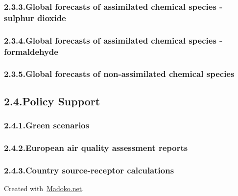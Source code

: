 \documentclass[9pt]{report}
\begin{document}
\subsubsection{2.3.3.\hspace*{0.5em}Global forecasts of assimilated chemical species - sulphur dioxide}\label{sec-global-forecasts-of-assimilated-chemical-species---sulphur-dioxide}%

\subsubsection{2.3.4.\hspace*{0.5em}Global forecasts of assimilated chemical species - formaldehyde}\label{sec-global-forecasts-of-assimilated-chemical-species---formaldehyde}%

\subsubsection{2.3.5.\hspace*{0.5em}Global forecasts of non-assimilated chemical species}\label{sec-global-forecasts-of-non-assimilated-chemical-species}%

\subsection{2.4.\hspace*{0.5em}Policy Support}\label{sec-policy-support}%

\subsubsection{2.4.1.\hspace*{0.5em}Green scenarios}\label{sec-green-scenarios}%

\subsubsection{2.4.2.\hspace*{0.5em}European air quality assessment reports}\label{sec-european-air-quality-assessment-reports}%

\subsubsection{2.4.3.\hspace*{0.5em}Country source-receptor calculations}\label{sec-country-source-receptor-calculations}%

\begin{mdbmargintb}{4em}{}%
\begin{mdflushright}%
{\tiny{}Created with~\href{https://www.madoko.net}{Madoko.net}.}%
\end{mdflushright}%
\end{mdbmargintb}%
\end{document}
